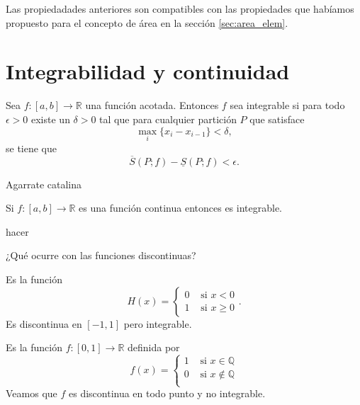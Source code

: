 \begin{observa} Las propiedadades anteriores son compatibles con las propiedades que habíamos propuesto para el concepto de área en la sección  \ref{sec:area_elem}.
\end{observa}

\section{Integrabilidad y continuidad}


 
\begin{teorema}{}  Sea $f:[a,b]\to\mathbb{R}$ una función acotada. Entonces  $f$ sea integrable si para todo $\epsilon>0$ existe un $\delta>0$ tal que para cualquier partición $P$ que satisface
\[\max_i\{x_i-x_{i-1}\}<\delta,\]
se tiene que
\begin{equation}\label{eq:Crit1Int}
 \overline{S}(P;f)-\underline{S}(P;f)<\epsilon.
\end{equation}
 
\end{teorema}
\begin{demo} Agarrate catalina
 
\end{demo}

\begin{teorema}{}  Si $f:[a,b]\to\mathbb{R}$ es una función continua entonces es integrable.
\end{teorema}
\begin{demo} hacer
 \end{demo}

 
¿Qué ocurre con las funciones discontinuas? 

\begin{ejemplo}{} Es la función
\[
 H(x)=\begin{cases}0 & \text{ si } x<0\\1 & \text{ si } x\geq 0\end{cases}.
\]
Es discontinua en $[-1,1]$ pero integrable.
 
\end{ejemplo}



\begin{ejemplo}{} Es la función $f:[0,1]\to\mathbb{R}$ definida por 
\[
 f(x)=\begin{cases} 1 & \text{ si } x\in\mathbb{Q}\\0 & \text{ si }   x\notin\mathbb{Q}\\
\end{cases}
\]
Veamos que $f$ es discontinua en todo punto y no integrable.
\end{ejemplo}





